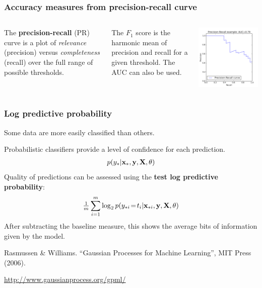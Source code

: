 \begin{frame}
\frametitle{Accuracy measures from precision-recall curve}
\begin{columns}
The {\bf precision-recall} (PR) curve is a plot of \emph{relevance} (precision) versus \emph{completeness} (recall) over the full range of possible thresholds.\par
\vspace{0.25cm}
The $F_1$ score is the harmonic mean of precision and recall for a given threshold. The AUC can also be used.\par
{}
\includegraphics[width=\textwidth]{sklearn_material/PR}
\end{columns}
\end{frame}


\begin{frame}
\frametitle{Log predictive probability}
Some data are more easily classified than others.\par
Probabilistic classifiers provide a level of confidence for each prediction.
\begin{align*}
p(y_*|{\bf x}_*,{\bf y},{\bf X},\theta)
\end{align*}
Quality of predictions can be assessed using the {\bf test log predictive probability}:
\begin{align*}
\tfrac{1}{m}\sum_{i=1}^m \log_2 p(y_{*i}\!=\!t_i|{\bf x}_{*i},{\bf y},{\bf X},\theta)
\end{align*}
After subtracting the baseline measure, this shows the average bits of information given by the model.\par
\vspace{0.25cm}
\begin{tiny}
Rasmussen \& Williams. ``Gaussian Processes for Machine Learning'', MIT Press (2006).\par
\url{http://www.gaussianprocess.org/gpml/}\par
\end{tiny}
\end{frame}

